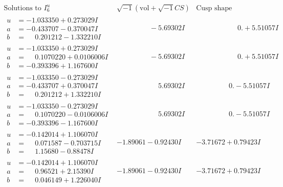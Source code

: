 \documentclass[1p]{elsarticle_modified}
\theoremstyle{definition}
\newcommand{\I}{\sqrt{-1}}
\begin{document}
$$\begin{array}{c|c|c}  
\text{Solutions to }I^u_{6}& \I (\text{vol} + \sqrt{-1}CS) & \text{Cusp shape}\\
 \hline 
\begin{aligned}
u &= -1.033350 + 0.273029 I \\
a &= -0.433707 - 0.370047 I \\
b &= \phantom{-}0.201212 - 1.332210 I\end{aligned}
 & \phantom{-0.000000 } -5.69302 I & \phantom{-0.000000 -}0. + 5.51057 I \\ \hline\begin{aligned}
u &= -1.033350 + 0.273029 I \\
a &= \phantom{-}0.1070220 + 0.0106006 I \\
b &= -0.393396 + 1.167600 I\end{aligned}
 & \phantom{-0.000000 } -5.69302 I & \phantom{-0.000000 -}0. + 5.51057 I \\ \hline\begin{aligned}
u &= -1.033350 - 0.273029 I \\
a &= -0.433707 + 0.370047 I \\
b &= \phantom{-}0.201212 + 1.332210 I\end{aligned}
 & \phantom{-0.000000 -}5.69302 I & \phantom{-0.000000 } 0. - 5.51057 I \\ \hline\begin{aligned}
u &= -1.033350 - 0.273029 I \\
a &= \phantom{-}0.1070220 - 0.0106006 I \\
b &= -0.393396 - 1.167600 I\end{aligned}
 & \phantom{-0.000000 -}5.69302 I & \phantom{-0.000000 } 0. - 5.51057 I \\ \hline\begin{aligned}
u &= -0.142014 + 1.106070 I \\
a &= \phantom{-}0.071587 - 0.703715 I \\
b &= \phantom{-}1.15680 - 0.88478 I\end{aligned}
 & -1.89061 - 0.92430 I & -3.71672 + 0.79423 I \\ \hline\begin{aligned}
u &= -0.142014 + 1.106070 I \\
a &= \phantom{-}0.96521 + 2.15390 I \\
b &= \phantom{-}0.046149 + 1.226040 I\end{aligned}
 & -1.89061 - 0.92430 I & -3.71672 + 0.79423 I \\ \hline\begin{aligned}

\end{aligned}
\end{array}$$
\end{document}
